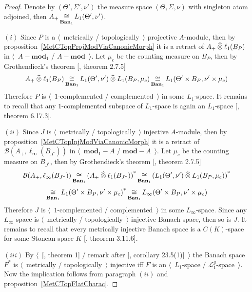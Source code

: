 \begin{proof} 

Denote by $(\Theta',\Sigma',\nu')$ the measure space $(\Theta,\Sigma,\nu)$ with
singleton atom adjoined, then $A_+\mathop{\mathbin{\cong}}\limits_{\mathbf{Ban}_1} L_1(\Theta',\nu')$.

$(i)$ Since $P$ is a $\langle$~metrically / topologically~$\rangle$ projective
$A$-module, then by proposition~\ref{MetCTopProjModViaCanonicMorph} it is a
retract of $A_+\mathbin{\widehat{\otimes}} \ell_1(B_P)$ in $\langle$~$A-\mathbf{mod}_1$ /
$A-\mathbf{mod}$~$\rangle$. Let $\mu_c$ be the counting measure on $B_P$, then
by Grothendieck's theorem [\cite{HelLectAndExOnFuncAn}, theorem 2.7.5]
$$
A_+\mathbin{\widehat{\otimes}}\ell_1(B_P)
\mathop{\mathbin{\cong}}\limits_{\mathbf{Ban}_1}L_1(\Theta',\nu')\mathbin{\widehat{\otimes}} L_1(B_P,\mu_c)
\mathop{\mathbin{\cong}}\limits_{\mathbf{Ban}_1}L_1(\Theta'\times B_P,\nu'\times \mu_c)
$$
Therefore $P$ is $\langle$~$1$-complemented / complemented~$\rangle$ in some
$L_1$-space. It remains to recall that any $1$-complemented subspace of
$L_1$-space is again an $L_1$-space [\cite{LaceyIsomThOfClassicBanSp}, theorem
6.17.3].

$(ii)$ Since $J$ is $\langle$~metrically / topologically~$\rangle$ injective
$A$-module, then by proposition~\ref{MetCTopInjModViaCanonicMorph} it is a
retract of $\mathcal{B}(A_+,\ell_\infty(B_{J^*}))$ in
$\langle$~$\mathbf{mod}_1-A$ / $\mathbf{mod}-A$~$\rangle$. Let $\mu_c$ be the
counting measure on $B_{J^*}$, then by Grothendieck's theorem
[\cite{HelLectAndExOnFuncAn}, theorem 2.7.5]
$$
\mathcal{B}(A_+,\ell_\infty(B_{J^*}))
\mathop{\mathbin{\cong}}\limits_{\mathbf{Ban}_1}
{(A_+\mathbin{\widehat{\otimes}} \ell_1(B_{J^*}))}^*
\mathop{\mathbin{\cong}}\limits_{\mathbf{Ban}_1}
{(L_1(\Theta',\nu')\mathbin{\widehat{\otimes}} L_1(B_P,\mu_c))}^*
$$
$$
\mathop{\mathbin{\cong}}\limits_{\mathbf{Ban}_1}{L_1(\Theta'\times B_P,\nu'\times \mu_c)}^*
\mathop{\mathbin{\cong}}\limits_{\mathbf{Ban}_1}L_\infty(\Theta'\times B_P,\nu'\times \mu_c)
$$
Therefore $J$ is $\langle$~$1$-complemented / complemented~$\rangle$ in some
$L_\infty$-space. Since any $L_\infty$-space is $\langle$~metrically /
topologically~$\rangle$ injective Banach space, then so is $J$. It remains to
recall that every metrically injective Banach space is a $C(K)$-space for some
Stonean space $K$ [\cite{LaceyIsomThOfClassicBanSp}, theorem 3.11.6].

$(iii)$  By $\langle$~[\cite{GrothMetrProjFlatBanSp}, theorem 1] / remark after
[\cite{DefFloTensNorOpId}, corollary 23.5(1)]~$\rangle$ the Banach space $F^*$
is $\langle$~metrically / topologically~$\rangle$ injective iff $F$ is an
$\langle$~$L_1$-space / $\mathscr{L}_1^g$-space~$\rangle$. Now the implication
follows from paragraph $(ii)$ and proposition~\ref{MetCTopFlatCharac}.
\end{proof}


